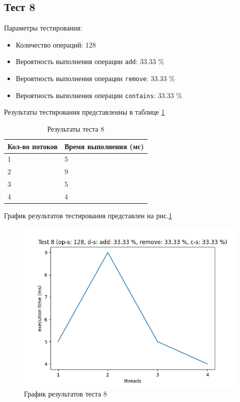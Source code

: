 \subsection*{Тест 8}

Параметры тестирования:

\begin{itemize}
    \item Количество операций: 128
    \item Вероятность выполнения операции \verb|add|: 33.33 \%
    \item Вероятность выполнения операции \verb|remove|: 33.33 \%
    \item Вероятность выполнения операции \verb|contains|: 33.33 \%
\end{itemize}

Результаты тестирования представленны в таблице \ref{tab:results8}


\begin{table}[H]
    \centering
    \begin{tabular}{|l|l|}
        \hline
        Кол-во потоков & Время выполнения (мс) \\
        \hline
        1 & 5 \\
        \hline
        2 & 9 \\
        \hline
        3 & 5 \\
        \hline
        4 & 4 \\
        \hline
    \end{tabular}
    \caption{Результаты теста 8}
    \label{tab:results8}
\end{table}
        

График результатов тестирования представлен на рис.\ref{fig:plot8}

\begin{figure}[H]
    \centering
    \includegraphics[width=0.7\linewidth]{photo/plot8}
    \caption{График результатов теста 8}
    \label{fig:plot8}
\end{figure}


